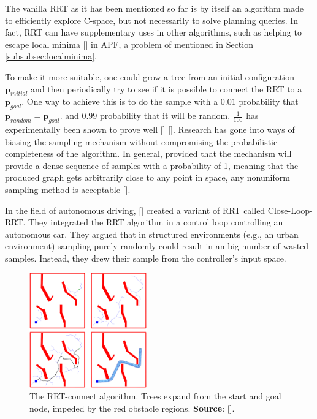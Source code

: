 The vanilla \gls{RRT} as it has been mentioned so far is by itself an algorithm made to efficiently explore C-space, but not necessarily to solve planning queries. In fact, \gls{RRT} can have supplementary uses in other algorithms, such as helping to escape local minima [\citeauthor{LaValle2006}] in \gls{APF}, a problem of mentioned in Section \ref{subsubsec:localminima}. 

To make it more suitable, one could grow a tree from an initial configuration $\textbf{p}_{initial}$ and then periodically try to see if it is possible to connect the \gls{RRT} to a $\textbf{p}_{goal}$. One way to achieve this is to do the sample with a $0.01$ probability that $\textbf{p}_{random} = \textbf{p}_{goal}$. and $0.99$ probability that it will be random. $\frac{1}{100}$ has experimentally been shown to prove well [\citeauthor{LaValle2006}] [\citeauthor{Urmson2004}]. Research has gone into ways of biasing the sampling mechanism without compromising the probabilistic completeness of the algorithm. In general, provided that the mechanism will provide a dense sequence of samples with a probability of 1, meaning that the produced graph gets arbitrarily close to any point in space, any nonuniform sampling method is acceptable [\citeauthor{LaValle2006}].

In the field of autonomous driving, [\citeauthor{Link2009}] created a variant of \gls{RRT} called Close-Loop-\gls{RRT}. They integrated the \gls{RRT} algorithm in a control loop controlling an autonomous car. They argued that in structured environments (e.g., an urban environment) sampling purely randomly could result in an big number of wasted samples. Instead, they drew their sample from the controller's input space.

\begin{figure}[h]
	\centering
	\includegraphics[width=0.45\textwidth]{import/RRT_connect.png}
	\caption{The RRT-connect algorithm. Trees expand from the start and goal node, impeded by the red obstacle regions. \textbf{Source}: [\citeauthor{Kuffner2002}].}
	\label{fig:RRT_connect}
\end{figure}

